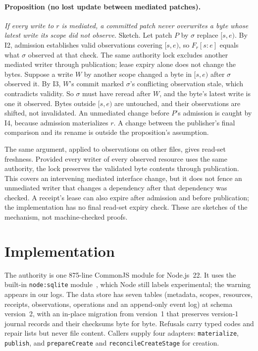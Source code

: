 \documentclass[10pt]{article}
\newcommand{\code}[1]{\texttt{#1}}
\begin{document}
\paragraph{Proposition (no lost update between mediated patches).}
\emph{If every write to $r$ is mediated, a committed patch never overwrites a byte whose latest write its scope did not observe.}
Sketch. Let patch $P$ by $\sigma$ replace $[s,e)$. By I2, admission establishes valid observations covering $[s,e)$, so $F_r[s{:}e]$ equals what $\sigma$ observed at that check. The same authority lock excludes another mediated writer through publication; lease expiry alone does not change the bytes. Suppose a write $W$ by another scope changed a byte in $[s,e)$ after $\sigma$ observed it. By I3, $W$'s commit marked $\sigma$'s conflicting observation stale, which contradicts validity. So $\sigma$ must have reread after $W$, and the byte's latest write is one it observed. Bytes outside $[s,e)$ are untouched, and their observations are shifted, not invalidated. An unmediated change before $P$'s admission is caught by I4, because admission materializes $r$. A change between the publisher's final comparison and its rename is outside the proposition's assumption.

The same argument, applied to observations on other files, gives read-set freshness. Provided every writer of every observed resource uses the same authority, the lock preserves the validated byte contents through publication. This covers an intervening mediated interface change, but it does not fence an unmediated writer that changes a dependency after that dependency was checked. A receipt's lease can also expire after admission and before publication; the implementation has no final read-set expiry check. These are sketches of the mechanism, not machine-checked proofs.

\section{Implementation}\label{sec:impl}

The authority is one 875-line CommonJS module for Node.js~22. It uses the built-in \code{node:sqlite} module~\citep{nodejs-sqlite}, which Node still labels experimental; the warning appears in our logs. The data store has seven tables (metadata, scopes, resources, receipts, observations, operations and an append-only event log) at schema version~2, with an in-place migration from version~1 that preserves version-1 journal records and their checksums byte for byte. Refusals carry typed codes and repair lists but never file content. Callers supply four adapters: \code{materialize}, \code{publish}, and \code{prepareCreate} and \code{reconcileCreateStage} for creation.
\end{document}
